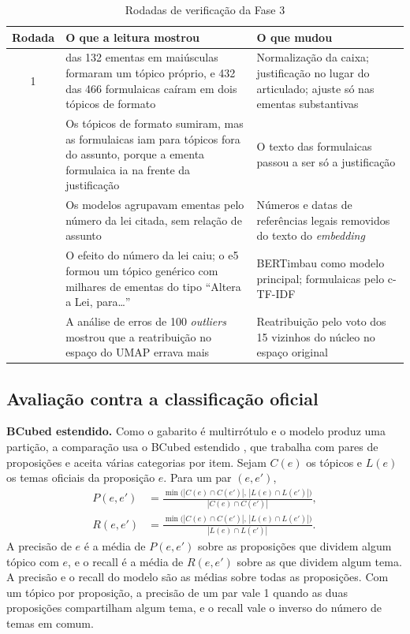 \begin{table}[H]
\centering
\caption{Rodadas de verificação da Fase 3}
\label{tab:rodadas}
\small
\begin{tabularx}{\textwidth}{c >{\raggedright\arraybackslash}X >{\raggedright\arraybackslash}X}
\toprule
\textbf{Rodada} & \textbf{O que a leitura mostrou} & \textbf{O que mudou} \\
\midrule
1 & 128 das 132 ementas em maiúsculas formaram um tópico próprio, e 432 das 466 formulaicas caíram em dois tópicos de formato & Normalização da caixa; justificação no lugar do articulado; ajuste só nas ementas substantivas \\
\addlinespace
2 & Os tópicos de formato sumiram, mas as formulaicas iam para tópicos fora do assunto, porque a ementa formulaica ia na frente da justificação & O texto das formulaicas passou a ser só a justificação \\
\addlinespace
3 & Os modelos agrupavam ementas pelo número da lei citada, sem relação de assunto & Números e datas de referências legais removidos do texto do \textit{embedding} \\
\addlinespace
4 & O efeito do número da lei caiu; o e5 formou um tópico genérico com milhares de ementas do tipo ``Altera a Lei, para\ldots'' & BERTimbau como modelo principal; formulaicas pelo c-TF-IDF \\
\addlinespace
5 & A análise de erros de 100 \textit{outliers} mostrou que a reatribuição no espaço do UMAP errava mais & Reatribuição pelo voto dos 15 vizinhos do núcleo no espaço original \\
\bottomrule
\end{tabularx}
\end{table}

\subsection{Avaliação contra a classificação oficial}
\label{subsec:avaliacao}

\textbf{BCubed estendido.} Como o gabarito é multirrótulo e o modelo produz uma partição, a comparação usa o BCubed estendido \citep{amigo2009comparison}, que trabalha com pares de proposições e aceita várias categorias por item. Sejam $C(e)$ os tópicos e $L(e)$ os temas oficiais da proposição $e$. Para um par $(e, e')$,
\begin{align}
P(e, e') &= \frac{\min\big(|C(e) \cap C(e')|,\, |L(e) \cap L(e')|\big)}{|C(e) \cap C(e')|}, \\
R(e, e') &= \frac{\min\big(|C(e) \cap C(e')|,\, |L(e) \cap L(e')|\big)}{|L(e) \cap L(e')|}.
\end{align}
A precisão de $e$ é a média de $P(e, e')$ sobre as proposições que dividem algum tópico com $e$, e o recall é a média de $R(e, e')$ sobre as que dividem algum tema. A precisão e o recall do modelo são as médias sobre todas as proposições. Com um tópico por proposição, a precisão de um par vale 1 quando as duas proposições compartilham algum tema, e o recall vale o inverso do número de temas em comum.

